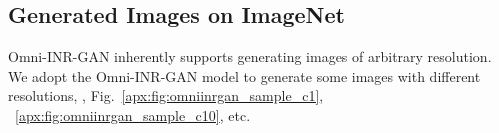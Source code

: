 \documentclass[paper_2425.tex]{subfiles}
\begin{document}
\subsection{Generated Images on ImageNet}

Omni-INR-GAN inherently supports generating images of arbitrary resolution. We adopt the Omni-INR-GAN  model to generate some images with different resolutions, \eg, Fig.~\ref{apx:fig:omniinrgan_sample_c1}, ~\ref{apx:fig:omniinrgan_sample_c10}, etc.



\begin{figure*}[t]
  \footnotesize
  \centering
  \renewcommand{\tabcolsep}{1pt} \renewcommand{\arraystretch}{0.8}
  \graphicspath{{figures/results/OmniINGAN_samples/class_0001_20210324_113415_932/}}
  \vspace{-5pt}
  \caption{Samples generated by our Omni-INR-GAN  model. Omni-INR-GAN has the ability to generate images of any resolution.}
  \label{apx:fig:omniinrgan_sample_c1}
  \vspace{-5pt}
\end{figure*}
\end{document}
